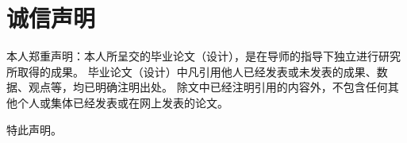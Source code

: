\section*{诚信声明}

本人郑重声明：本人所呈交的毕业论文（设计），是在导师的指导下独立进行研究所取得的成果。
毕业论文（设计）中凡引用他人已经发表或未发表的成果、数据、观点等，均已明确注明出处。
除文中已经注明引用的内容外，不包含任何其他个人或集体已经发表或在网上发表的论文。

特此声明。
\newpage
